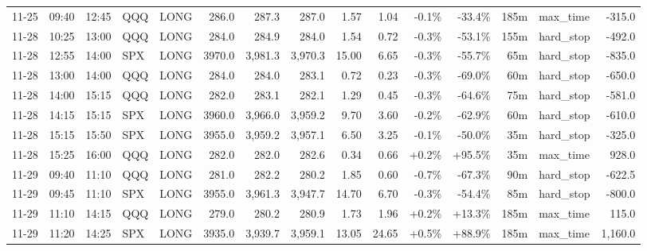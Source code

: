 \documentclass[11pt,a4paper,twoside]{article}
\begin{document}
\begin{landscape}
\begin{center}
\begin{longtable}{>{\color{txtmain}}l l l l l r r r r r r r r >{\color{txtmain}}l r}
11-25 & 09:40 & 12:45 & QQQ & LONG & 286.0 & 287.3 & 287.0 & 1.57 & 1.04 & \textcolor{lossred}{-0.1\%} & \textcolor{lossred}{-33.4\%} & 185m & max\_time & \textcolor{lossred}{-315.0} \\
11-28 & 10:25 & 13:00 & QQQ & LONG & 284.0 & 284.9 & 284.0 & 1.54 & 0.72 & \textcolor{lossred}{-0.3\%} & \textcolor{lossred}{-53.1\%} & 155m & hard\_stop & \textcolor{lossred}{-492.0} \\
11-28 & 12:55 & 14:00 & SPX & LONG & 3970.0 & 3,981.3 & 3,970.3 & 15.00 & 6.65 & \textcolor{lossred}{-0.3\%} & \textcolor{lossred}{-55.7\%} & 65m & hard\_stop & \textcolor{lossred}{-835.0} \\
11-28 & 13:00 & 14:00 & QQQ & LONG & 284.0 & 284.0 & 283.1 & 0.72 & 0.23 & \textcolor{lossred}{-0.3\%} & \textcolor{lossred}{-69.0\%} & 60m & hard\_stop & \textcolor{lossred}{-650.0} \\
11-28 & 14:00 & 15:15 & QQQ & LONG & 282.0 & 283.1 & 282.1 & 1.29 & 0.45 & \textcolor{lossred}{-0.3\%} & \textcolor{lossred}{-64.6\%} & 75m & hard\_stop & \textcolor{lossred}{-581.0} \\
11-28 & 14:15 & 15:15 & SPX & LONG & 3960.0 & 3,966.0 & 3,959.2 & 9.70 & 3.60 & \textcolor{lossred}{-0.2\%} & \textcolor{lossred}{-62.9\%} & 60m & hard\_stop & \textcolor{lossred}{-610.0} \\
11-28 & 15:15 & 15:50 & SPX & LONG & 3955.0 & 3,959.2 & 3,957.1 & 6.50 & 3.25 & \textcolor{lossred}{-0.1\%} & \textcolor{lossred}{-50.0\%} & 35m & hard\_stop & \textcolor{lossred}{-325.0} \\
11-28 & 15:25 & 16:00 & QQQ & LONG & 282.0 & 282.0 & 282.6 & 0.34 & 0.66 & \textcolor{wingreen}{+0.2\%} & \textcolor{wingreen}{+95.5\%} & 35m & max\_time & \textcolor{wingreen}{928.0} \\
11-29 & 09:40 & 11:10 & QQQ & LONG & 281.0 & 282.2 & 280.2 & 1.85 & 0.60 & \textcolor{lossred}{-0.7\%} & \textcolor{lossred}{-67.3\%} & 90m & hard\_stop & \textcolor{lossred}{-622.5} \\
11-29 & 09:45 & 11:10 & SPX & LONG & 3955.0 & 3,961.3 & 3,947.7 & 14.70 & 6.70 & \textcolor{lossred}{-0.3\%} & \textcolor{lossred}{-54.4\%} & 85m & hard\_stop & \textcolor{lossred}{-800.0} \\
11-29 & 11:10 & 14:15 & QQQ & LONG & 279.0 & 280.2 & 280.9 & 1.73 & 1.96 & \textcolor{wingreen}{+0.2\%} & \textcolor{wingreen}{+13.3\%} & 185m & max\_time & \textcolor{wingreen}{115.0} \\
11-29 & 11:20 & 14:25 & SPX & LONG & 3935.0 & 3,939.7 & 3,959.1 & 13.05 & 24.65 & \textcolor{wingreen}{+0.5\%} & \textcolor{wingreen}{+88.9\%} & 185m & max\_time & \textcolor{wingreen}{1,160.0} \\

\end{longtable}
\end{center}
\end{landscape}
\end{document}
